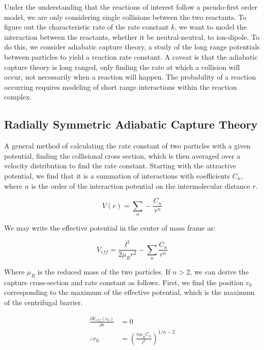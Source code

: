 Under the understanding that the reactions of interest follow a pseudo-first order model, we are only considering single collisions between the two reactants. To figure out the characteristic rate of the rate constant $k$, we want to model the interaction between the reactants, whether it be neutral-neutral, to ion-dipole. To do this, we consider adiabatic capture theory, a study of the long range potentials between particles to yield a reaction rate constant. A caveat is that the adiabatic capture theory is long ranged, only finding the rate at which a collision will occur, not necessarily when a reaction will happen. The probability of a reaction occurring requires modeling of short range interactions within the reaction complex.

\subsection{Radially Symmetric Adiabatic Capture Theory} \label{sec: ACT}
A general method of calculating the rate constant of two particles with a given potential, finding the collisional cross section, which is then averaged over a velocity distribution to find the rate constant.\cite{Zhang2017} Starting with the attractive potential, we find that it is a summation of interactions with coefficients $C_n$, where $n$ is the order of the interaction potential on the intermolecular distance $r$.

\begin{equation}
    V(r) = \sum_n -\frac{C_n}{r^n}
\end{equation}

We may write the effective potential in the center of mass frame as:

\begin{equation}
    V_{eff} = \frac{l^2}{2 \mu_R r^2} - \sum_n \frac{C_n}{r^n}\label{eq: veff}
\end{equation}

Where $\mu_R$ is the reduced mass of the two particles. If $n > 2$, we can derive the capture cross-section and rate constant as follows. First, we find the position $r_0$ corresponding to the maximum of the effective potential, which is the maximum of the centrifugal barrier.

\begin{align*}
    \frac{\partial V_{eff}(r_0)}{\partial r} & = 0 \\
    \therefore r_0 & = \left(\frac{n \mu_R C_n}{l^2}\right)^{1/n-2}
\end{align*}

